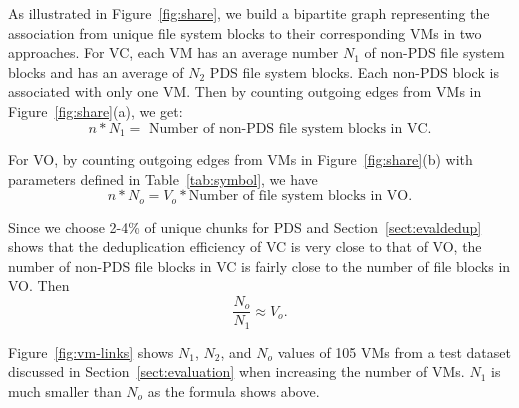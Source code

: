 As illustrated in Figure~\ref{fig:share}, we build a bipartite graph representing the
association from unique file system blocks to their corresponding VMs in two 
approaches. 
For VC, each VM has an average number $N_1$ of non-PDS file system blocks
and  has  an average of  $N_2$ PDS file system blocks. 
Each non-PDS block is associated with only one VM.
Then by counting outgoing edges from VMs in Figure~\ref{fig:share}(a), we get:
\[
n* N_1   = \mbox{ Number of non-PDS file system blocks in VC.} 
\]

For VO, 
by counting outgoing edges from VMs in Figure~\ref{fig:share}(b) with parameters defined in
Table~\ref{tab:symbol},  we have 
\[
n *N_o   =  V_o * \mbox{Number of file system blocks in VO}.
\]

Since we choose 2-4\% of unique chunks for PDS
and Section~\ref{sect:evaldedup} 
shows that the deduplication efficiency of VC is very close to that of VO,
the number of non-PDS file blocks in VC is fairly close to the number of file blocks in VO.
Then
\[
\frac{N_o}{N_1} \approx  V_o.
\]

Figure~\ref{fig:vm-links} shows $N_1$, $N_2$, and $N_o$ values of 105 VMs from a  test dataset 
discussed in Section~\ref{sect:evaluation} when increasing the number of VMs.  
$N_1$ is much smaller than $N_o$ as the formula shows above. 




